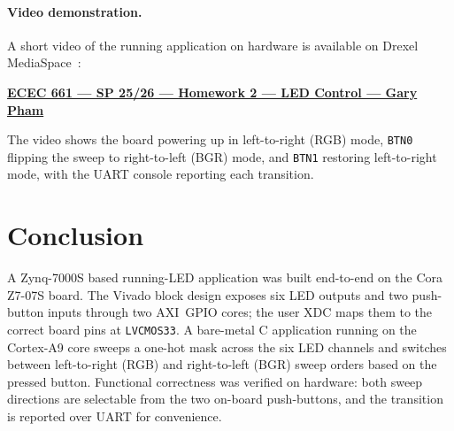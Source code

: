 \documentclass[12pt]{article}
\begin{document}
\paragraph{Video demonstration.}
A short video of the running application on hardware is available on
Drexel MediaSpace~\cite{demovideo}:

\begin{center}
\href{https://1513041.mediaspace.kaltura.com/media/ECEC+661+-+SP+25+26+-+Homework+2+-+LED+Control+-+Gary+Pham/1_m3jcfnvb}%
     {\textbf{ECEC 661 --- SP 25/26 --- Homework 2 --- LED Control --- Gary Pham}}
\end{center}

\noindent
The video shows the board powering up in left-to-right (RGB) mode,
\texttt{BTN0} flipping the sweep to right-to-left (BGR) mode, and
\texttt{BTN1} restoring left-to-right mode, with the UART console
reporting each transition.

\section{Conclusion}
\label{sec:conclusion}

A Zynq-7000S based running-LED application was built end-to-end on the
Cora Z7-07S board. The Vivado block design exposes six LED outputs and
two push-button inputs through two AXI~GPIO cores; the user XDC maps
them to the correct board pins at \texttt{LVCMOS33}. A bare-metal C
application running on the Cortex-A9 core sweeps a one-hot mask across
the six LED channels and switches between left-to-right (RGB) and
right-to-left (BGR) sweep orders based on the pressed button.
Functional correctness was verified on hardware: both sweep directions
are selectable from the two on-board push-buttons, and the transition
is reported over UART for convenience.


\end{document}
